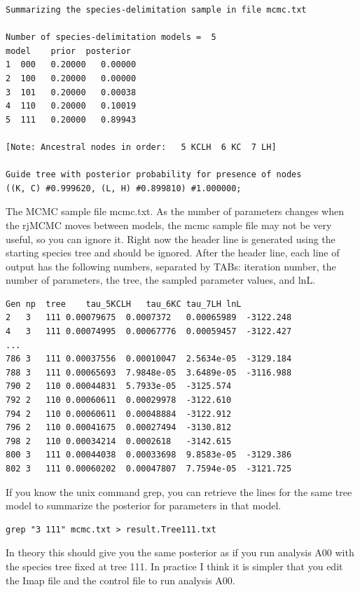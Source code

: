\documentclass[a4paper]{book}
\numberwithin{equation}{section} \renewcommand{\baselinestretch}{0.55}
\begin{document}
\begin{verbatim}
Summarizing the species-delimitation sample in file mcmc.txt

Number of species-delimitation models =  5
model    prior  posterior
1  000   0.20000   0.00000
2  100   0.20000   0.00000
3  101   0.20000   0.00038
4  110   0.20000   0.10019
5  111   0.20000   0.89943

[Note: Ancestral nodes in order:   5 KCLH  6 KC  7 LH]

Guide tree with posterior probability for presence of nodes
((K, C) #0.999620, (L, H) #0.899810) #1.000000;
\end{verbatim}
The MCMC sample file mcmc.txt.  As the number of parameters changes
when the rjMCMC moves between models, the mcmc sample file may not be
very useful, so you can ignore it.  Right now the header line is
generated using the starting species tree and should be ignored.
After the header line, each line of output has the following numbers,
separated by TABs: iteration number, the number of parameters, the
tree, the sampled parameter values, and lnL.  {\small
\begin{verbatim}
Gen	np	tree	tau_5KCLH	tau_6KC	tau_7LH	lnL
2	3	111	0.00079675	0.0007372	0.00065989	-3122.248
4	3	111	0.00074995	0.00067776	0.00059457	-3122.427
...
786	3	111	0.00037556	0.00010047	2.5634e-05	-3129.184
788	3	111	0.00065693	7.9848e-05	3.6489e-05	-3116.988
790	2	110	0.00044831	5.7933e-05	-3125.574
792	2	110	0.00060611	0.00029978	-3122.610
794	2	110	0.00060611	0.00048884	-3122.912
796	2	110	0.00041675	0.00027494	-3130.812
798	2	110	0.00034214	0.0002618	-3142.615
800	3	111	0.00044038	0.00033698	9.8583e-05	-3129.386
802	3	111	0.00060202	0.00047807	7.7594e-05	-3121.725
\end{verbatim}
} If you know the unix command grep, you can retrieve the lines for
the same tree model to summarize the posterior for parameters in that
model.

{\small
\begin{verbatim}
grep "3 111" mcmc.txt > result.Tree111.txt
\end{verbatim}
} In theory this should give you the same posterior as if you run
analysis A00 with the species tree fixed at tree 111.  In practice I
think it is simpler that you edit the Imap file and the control file
to run analysis A00.
\end{document}
